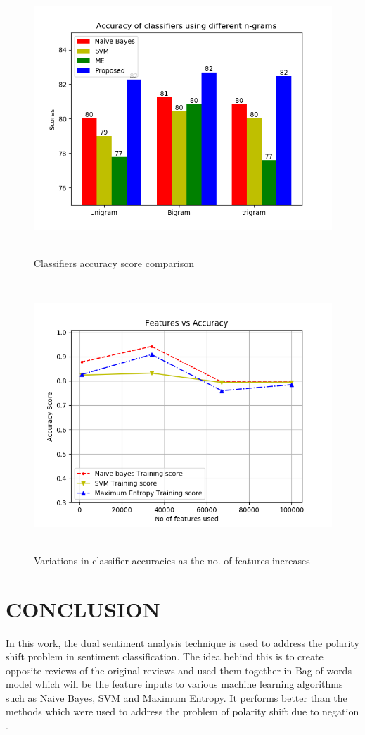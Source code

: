 \documentclass[oneside,a4paper,12pt]{pictreport}
\begin{document}
\begin{figure}[!h]
\includegraphics[width=5.0in,height=4.0in]{Comparison.png}
\caption{Classifiers accuracy score comparison}
\end{figure}


\begin{figure}[!h]
\includegraphics[width=5.0in,height=4.0in]{figure_1.png}
\caption{Variations in classifier accuracies as the no. of features increases}
\end{figure}



\chapter{CONCLUSION}
In this work, the dual sentiment analysis technique is used
to address the polarity shift problem in sentiment classification.
The idea behind this is to create opposite reviews of the
original reviews and used them together in Bag of words model
which will be the feature inputs to various machine learning
algorithms such as Naive Bayes, SVM and Maximum Entropy. It
performs better than the methods which were used to address
the problem of polarity shift due to negation .
\end{document}

